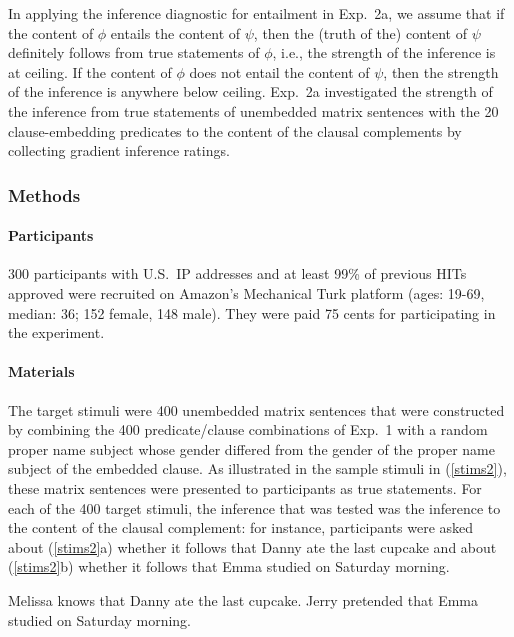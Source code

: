 \documentclass[11pt,fleqn]{article}
\newcommand{\6}{\mbox{$[\hspace*{-.6mm}[$}}
\newcommand{\9}{\mbox{$]\hspace*{-.6mm}]$}}
\begin{document}
In applying the inference diagnostic for entailment in Exp.~2a, we assume that if the content of $\phi$ entails the content of $\psi$, then the (truth of the) content of $\psi$ definitely follows from true statements of $\phi$, i.e., the strength of the inference is at ceiling. If the content of $\phi$ does not entail the content of $\psi$, then the strength of the inference is anywhere below ceiling. Exp.~2a investigated the strength of the inference from true statements of unembedded matrix sentences with the 20 clause-embedding predicates to the content of the clausal complements by collecting gradient inference ratings.

\subsubsection{Methods}

\paragraph{Participants} 300 participants with U.S.\ IP addresses and at least 99\% of previous HITs approved were recruited on Amazon's Mechanical Turk platform (ages: 19-69, median: 36; 152 female, 148 male). They were paid 75 cents for participating in the experiment.

\paragraph{Materials} The target stimuli were 400 unembedded matrix sentences that were constructed by combining the 400 predicate/clause combinations of Exp.~1 with a random proper name subject whose gender differed from the gender of the proper name subject of the embedded clause. As illustrated in the sample stimuli in (\ref{stims2}), these matrix sentences were presented to participants as true statements. For each of the 400 target stimuli, the inference that was tested was the inference to the content of the clausal complement: for instance, participants were asked about (\ref{stims2}a) whether it follows that Danny ate the last cupcake and about (\ref{stims2}b) whether it follows that Emma studied on Saturday morning.

\begin{exe}
\ex\label{stims2}
\begin{xlist}
 Melissa knows that Danny ate the last cupcake.
 Jerry pretended that Emma studied on Saturday morning.
\end{xlist}
\end{exe}
\end{document}
